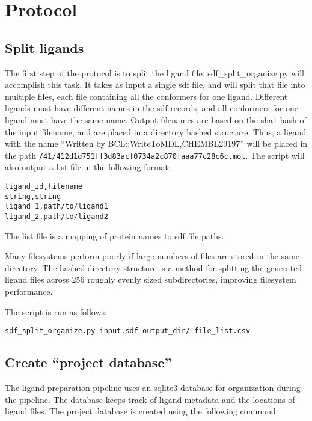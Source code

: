 \section{Protocol}

\subsection{Split ligands}

The first step of the protocol is to split the ligand file.
sdf\_split\_organize.py will accomplish this task. 
It takes as input a single sdf file, and will split that file into multiple files, each file containing all the conformers for one ligand.
Different ligands must have different names in the sdf records, and all conformers for one ligand must have the same name. 
Output filenames are based on the sha1 hash of the input filename, and are placed in a directory hashed structure.
Thus, a ligand with the name ``Written by BCL::WriteToMDL,CHEMBL29197''
will be placed in the path \texttt{/41/412d1d751ff3d83acf0734a2c870faaa77c28c6c.mol}.
The script will also output a list file in the following format:

\begin{verbatim}
ligand_id,filename
string,string
ligand_1,path/to/ligand1
ligand_2,path/to/ligand2
\end{verbatim}

The list file is a mapping of protein names to sdf file paths.

Many filesystems perform poorly if large numbers of files are stored in the same directory. 
The hashed directory structure is a method for splitting the generated ligand files across 256 roughly evenly sized subdirectories, improving filesystem performance.

The script is run as follows:

\begin{verbatim}
sdf_split_organize.py input.sdf output_dir/ file_list.csv
\end{verbatim}

\subsection{Create ``project database''}

The ligand preparation pipeline uses an \href{http://www.sqlite.org/}{sqlite3} database for organization during the pipeline.
The database keeps track of ligand metadata and the locations of ligand files.
The project database is created using the following command:

